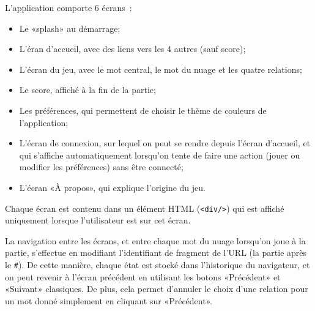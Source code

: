 \documentclass[a4paper,11pt,french]{article}
\begin{document}
{L'application comporte 6 écrans~:
\begin{itemize}
\item Le «splash» au démarrage;
\item L'éran d'accueil, avec des liens vers les 4 autres (sauf score);
\item L'écran du jeu, avec le mot central, le mot du nuage et les quatre relations;
\item Le score, affiché à la fin de la partie;
\item Les préférences, qui permettent de choisir le thème de couleurs de l'application;
\item L'écran de connexion, sur lequel on peut se rendre depuis l'écran d'accueil, et qui s'affiche automatiquement lorsqu'on tente de faire
  une action (jouer ou modifier les préférences) sans être connecté;
\item L'écran «À propos», qui explique l'origine du jeu.
\end{itemize}
Chaque écran est contenu dans un élément HTML (\verb!<div/>!) qui est affiché uniquement lorsque l'utilisateur est sur cet écran.

La navigation entre les écrans, et entre chaque mot du nuage lorsqu'on joue à la partie, s'effectue en modifiant l'identifiant de fragment
de l'URL (la partie après le \verb!#!). De cette manière, chaque état est stocké dans l'historique du navigateur, et on peut revenir à
l'écran précédent en utilisant les botons «Précédent» et «Suivant» classiques. De plus, cela permet d'annuler le choix d'une relation pour
un mot donné simplement en cliquant sur «Précédent».

}
\end{document}
